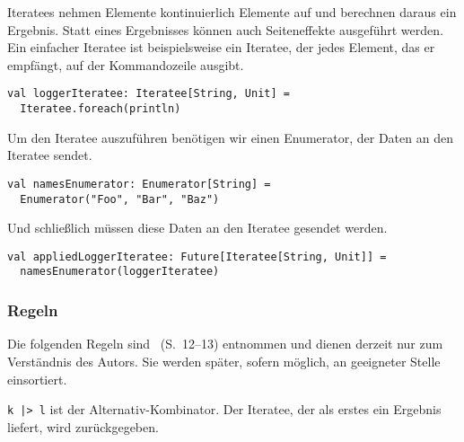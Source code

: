 \documentclass[draft=false
              ,paper=a4
              ,twoside=false
              ,fontsize=11pt
              ,headsepline
              ,BCOR10mm
              ,DIV11
              ]{scrbook}
\begin{document}
Iteratees nehmen Elemente kontinuierlich Elemente auf und berechnen daraus ein Ergebnis.
Statt eines Ergebnisses können auch Seiteneffekte ausgeführt werden.
Ein einfacher Iteratee ist beispielsweise ein Iteratee, der jedes Element, das er empfängt, auf der Kommandozeile ausgibt.
\begin{lstlisting}
val loggerIteratee: Iteratee[String, Unit] =
  Iteratee.foreach(println)
\end{lstlisting}
Um den Iteratee auszuführen benötigen wir einen Enumerator, der Daten an den Iteratee sendet.
\begin{lstlisting}
val namesEnumerator: Enumerator[String] =
  Enumerator("Foo", "Bar", "Baz")
\end{lstlisting}
Und schließlich müssen diese Daten an den Iteratee gesendet werden.
\begin{lstlisting}
val appliedLoggerIteratee: Future[Iteratee[String, Unit]] =
  namesEnumerator(loggerIteratee)
\end{lstlisting}



\subsubsection{Regeln} %
\label{ssub:regeln}

Die folgenden Regeln sind \citealt{kiselyov2012}~(S.~12--13) entnommen und dienen derzeit nur zum Verständnis des Autors.
Sie werden später, sofern möglich, an geeigneter Stelle einsortiert.

\lstinline!k |> l! ist der Alternativ-Kombinator. Der Iteratee, der als erstes ein Ergebnis liefert, wird zurückgegeben.
\end{document}
